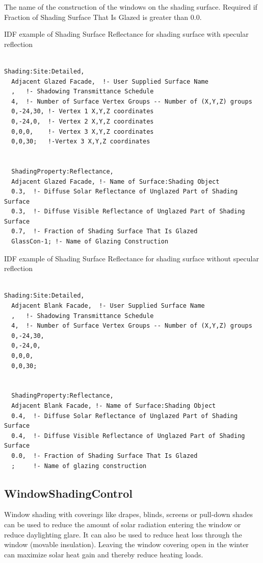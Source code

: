 The name of the construction of the windows on the shading surface. Required if Fraction of Shading Surface That Is Glazed is greater than 0.0.

IDF example of Shading Surface Reflectance for shading surface with specular reflection

\begin{lstlisting}

Shading:Site:Detailed,
  Adjacent Glazed Facade,  !- User Supplied Surface Name
  ,   !- Shadowing Transmittance Schedule
  4,  !- Number of Surface Vertex Groups -- Number of (X,Y,Z) groups
  0,-24,30, !- Vertex 1 X,Y,Z coordinates
  0,-24,0,  !- Vertex 2 X,Y,Z coordinates
  0,0,0,    !- Vertex 3 X,Y,Z coordinates
  0,0,30;   !-Vertex 3 X,Y,Z coordinates


  ShadingProperty:Reflectance,
  Adjacent Glazed Facade, !- Name of Surface:Shading Object
  0.3,  !- Diffuse Solar Reflectance of Unglazed Part of Shading Surface
  0.3,  !- Diffuse Visible Reflectance of Unglazed Part of Shading Surface
  0.7,  !- Fraction of Shading Surface That Is Glazed
  GlassCon-1; !- Name of Glazing Construction
\end{lstlisting}

IDF example of Shading Surface Reflectance for shading surface without specular reflection

\begin{lstlisting}

Shading:Site:Detailed,
  Adjacent Blank Facade,  !- User Supplied Surface Name
  ,   !- Shadowing Transmittance Schedule
  4,  !- Number of Surface Vertex Groups -- Number of (X,Y,Z) groups
  0,-24,30,
  0,-24,0,
  0,0,0,
  0,0,30;


  ShadingProperty:Reflectance,
  Adjacent Blank Facade, !- Name of Surface:Shading Object
  0.4,  !- Diffuse Solar Reflectance of Unglazed Part of Shading Surface
  0.4,  !- Diffuse Visible Reflectance of Unglazed Part of Shading Surface
  0.0,  !- Fraction of Shading Surface That Is Glazed
  ;     !- Name of glazing construction
\end{lstlisting}

\subsection{WindowShadingControl}\label{windowpropertyshadingcontrol}

Window shading with coverings like drapes, blinds, screens or pull-down shades can be used to reduce the amount of solar radiation entering the window or reduce daylighting glare. It can also be used to reduce heat loss through the window (movable insulation). Leaving the window covering open in the winter can maximize solar heat gain and thereby reduce heating loads.

